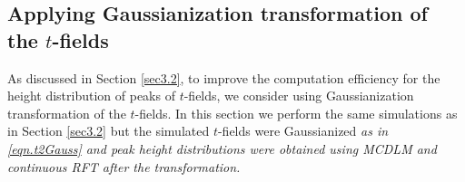 \documentclass{article}
\newcommand{\nt}[1]{\textit{\color{red} #1}}
\begin{document}

\subsection{Applying Gaussianization transformation of the $t$-fields}\label{SS:gauss}
As discussed in Section \ref{sec3.2}, to improve the computation efficiency for the height distribution of peaks of $t$-fields, we consider using Gaussianization transformation of the $t$-fields. In this section we perform the same simulations as in Section \ref{sec3.2} but the simulated $t$-fields were Gaussianized \nt{as in \eqref{eqn.t2Gauss} and peak height distributions were obtained using MCDLM and continuous RFT after the transformation.}
\end{document}
